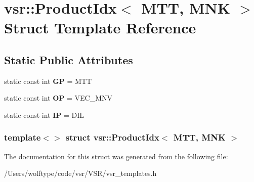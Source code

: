 \hypertarget{structvsr_1_1_product_idx_3_01_m_t_t_00_01_m_n_k_01_4}{\section{vsr\-:\-:Product\-Idx$<$ M\-T\-T, M\-N\-K $>$ Struct Template Reference}
\label{structvsr_1_1_product_idx_3_01_m_t_t_00_01_m_n_k_01_4}
}
\subsection*{Static Public Attributes}
\begin{DoxyCompactItemize}
\item 
\hypertarget{structvsr_1_1_product_idx_3_01_m_t_t_00_01_m_n_k_01_4_a76471cc3dd6b929ac3183670bfb1d2de}{static const int {\bfseries G\-P} = M\-T\-T}\label{structvsr_1_1_product_idx_3_01_m_t_t_00_01_m_n_k_01_4_a76471cc3dd6b929ac3183670bfb1d2de}

\item 
\hypertarget{structvsr_1_1_product_idx_3_01_m_t_t_00_01_m_n_k_01_4_ab0faa2742779a8a481257650362f3217}{static const int {\bfseries O\-P} = V\-E\-C\-\_\-\-M\-N\-V}\label{structvsr_1_1_product_idx_3_01_m_t_t_00_01_m_n_k_01_4_ab0faa2742779a8a481257650362f3217}

\item 
\hypertarget{structvsr_1_1_product_idx_3_01_m_t_t_00_01_m_n_k_01_4_a6a671cf8b1fdc1d7d4261ec7747603e2}{static const int {\bfseries I\-P} = D\-I\-L}\label{structvsr_1_1_product_idx_3_01_m_t_t_00_01_m_n_k_01_4_a6a671cf8b1fdc1d7d4261ec7747603e2}

\end{DoxyCompactItemize}
\subsubsection*{template$<$$>$ struct vsr\-::\-Product\-Idx$<$ M\-T\-T, M\-N\-K $>$}



The documentation for this struct was generated from the following file\-:\begin{DoxyCompactItemize}
\item 
/\-Users/wolftype/code/vsr/\-V\-S\-R/vsr\-\_\-templates.\-h\end{DoxyCompactItemize}
